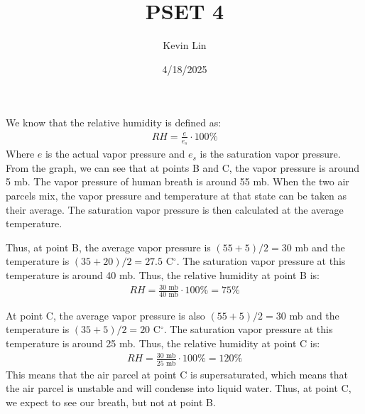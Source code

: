 \documentclass[11pt,a4paper,margin=1in]{article}
\title{PSET 4}
\author{Kevin Lin}
\date{4/18/2025}
\begin{document}
\maketitle
\section{}
We know that the relative humidity is defined as:
\begin{gather*}
    RH = \frac{e}{e_s} \cdot 100\%
\end{gather*}
Where $e$ is the actual vapor pressure and $e_s$ is the saturation vapor pressure.
From the graph, we can see that at points B and C, the vapor pressure is around
5 mb. The vapor pressure of human breath is around 55 mb. When the two air parcels 
mix, the vapor pressure and temperature at that state can be taken as their average.
The saturation vapor pressure is then calculated at the average temperature. 

Thus, at point B, the average vapor pressure is $(55 + 5) / 2 = 30$ mb and the 
temperature is $(35 + 20) / 2 = 27.5$ C$^{\circ}$. The saturation vapor pressure 
at this temperature is around 40 mb. Thus, the relative humidity at point B is:
\begin{gather*}
    RH = \frac{30 \text{ mb}}{40 \text{ mb}} \cdot 100\% = 75\%
\end{gather*}

At point C, the average vapor pressure is also $(55 + 5) / 2 = 30$ mb and the
temperature is $(35 + 5) / 2 = 20$ C$^{\circ}$. The saturation vapor pressure at
this temperature is around 25 mb. Thus, the relative humidity at point C is:
\begin{gather*}
    RH = \frac{30 \text{ mb}}{25 \text{ mb}} \cdot 100\% = 120\%
\end{gather*}
This means that the air parcel at point C is supersaturated, which means that
the air parcel is unstable and will condense into liquid water. Thus, at point C,
we expect to see our breath, but not at point B.
\end{document}
